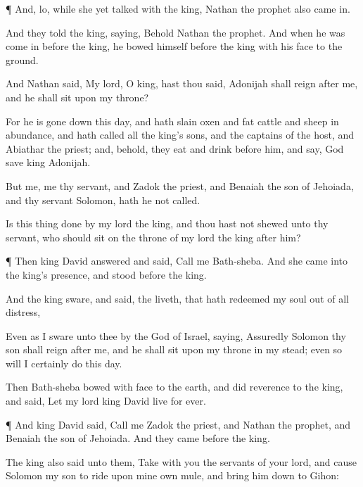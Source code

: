 {\par }{\PP {}¶ And, lo, while she yet
talked with the
king,
Nathan the
prophet also came
in.

And they
told the
king,
saying, Behold
Nathan the
prophet. And when he was come
in
before the
king, he
bowed himself before the
king with his
face to the
ground.

And
Nathan
said, My
lord, O
king, hast thou
said,
Adonijah shall
reign
after me, and he shall
sit upon my
throne?

For he is gone
down this
day, and hath
slain
oxen and fat
cattle and
sheep in
abundance, and hath
called all the
king’s
sons, and the
captains of the
host, and
Abiathar the
priest; and, behold, they
eat and
drink
before him, and
say, God
save
king
Adonijah.

But me,
{} me thy
servant, and
Zadok the
priest, and
Benaiah the
son of
Jehoiada, and thy
servant
Solomon, hath he not
called.

Is this
thing
done by my
lord the
king, and thou hast not
shewed
{} unto thy
servant, who should
sit on the
throne of my
lord the
king
after him?


\par }{\PP {}¶ Then
king
David
answered and
said,
Call me
Bath-sheba. And she
came into the
king’s
presence, and
stood
before the
king.

And the
king
sware, and
said,
{} the
{}
liveth, that hath
redeemed my
soul out of all
distress,

Even as I
sware unto thee by the
{}
God of
Israel,
saying, Assuredly
Solomon thy
son shall
reign
after me, and he shall
sit upon my
throne in my stead; even so will I certainly
do this
day.

Then
Bath-sheba
bowed with
{}
face to the
earth, and did
reverence to the
king, and
said, Let my
lord
king
David
live for
ever.


\par }{\PP {}¶ And
king
David
said,
Call me
Zadok the
priest, and
Nathan the
prophet, and
Benaiah the
son of
Jehoiada. And they
came
before the
king.

The
king also
said unto them,
Take with you the
servants of your
lord, and cause
Solomon my
son to
ride upon mine own
mule, and bring him
down to
Gihon:

}
